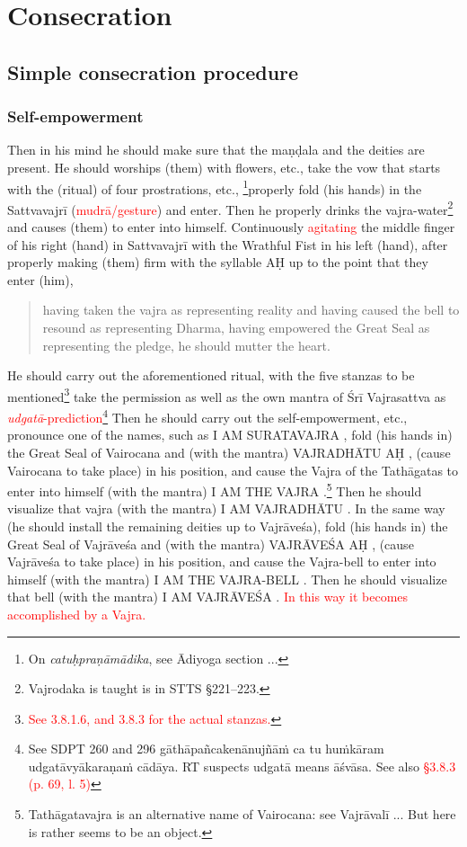 \documentclass[11pt]{book}
\makeatletter
\def\fakesc#1{%
  \begingroup%
  \xdef\fake@name{\csname\curr@fontshape/\f@size\endcsname}%
  \fontsize{1.3\fontdimen8\fake@name}{\baselineskip}\selectfont%
  \uppercase{#1}%
  \endgroup%
}
\newcommand{\mantra}[1]{\fakesc{#1}}
\newcommand{\red}[1]{\textcolor{red}{#1}}
\newcommand{\skt}[1]{\emph{#1}}
\makeatother
\begin{document}
\section{Consecration}
\subsection{Simple consecration procedure}%
\subsubsection{Self-empowerment}
Then in his mind he should make sure that the maṇḍala and the deities are present. He should worships (them) with flowers, etc., take the vow that starts with the (ritual) of four prostrations, etc., \footnote{On \skt{catuḥpraṇāmādika}, see Ādiyoga section ...}properly fold (his hands) in the Sattvavajrī (\red{mudrā/gesture}) and enter. Then he properly drinks the vajra-water\footnote{Vajrodaka is taught is in STTS §221–223.} and causes (them) to enter into himself.  Continuously  \red{agitating} the middle finger of his right (hand) in Sattvavajrī with the Wrathful Fist in his left (hand), after properly making (them) firm with the syllable \mantra{aḥ} up to the point that they enter (him),

\begin{verse}
having taken the vajra as representing reality and having caused the bell to resound as representing Dharma, having empowered the Great Seal as representing the pledge, he should mutter the heart.
\end{verse}

He should carry out the aforementioned ritual, with the five stanzas to be mentioned\footnote{\red{See 3.8.1.6, and 3.8.3 for the actual stanzas.}} take the permission as well as the own mantra of Śrī Vajrasattva as \red{\skt{udgatā}-prediction}\footnote{See SDPT 260 and 296 gāthāpañcakenānujñāṁ ca tu huṁkāram udgatāvyākaraṇaṁ cādāya. RT suspects udgatā means āśvāsa. See also \red{§3.8.3 (p. 69, l. 5)}} Then he should carry out the self-empowerment, etc., pronounce one of the names, such as \mantra{I am Suratavajra}, fold (his hands in) the Great Seal of Vairocana and (with the mantra) \mantra{vajradhātu aḥ}, (cause Vairocana to take place) in his position, and cause the Vajra of the Tathāgatas to enter into himself (with the mantra) \mantra{I am the Vajra}.\footnote{Tathāgatavajra is an alternative name of Vairocana: see Vajrāvalī ... But here is rather seems to be an object.} Then he should visualize that vajra (with the mantra) \mantra{I am Vajradhātu}. In the same way (he should install the remaining deities up to Vajrāveśa), fold (his hands in) the Great Seal of Vajrāveśa and (with the mantra) \mantra{vajrāveśa aḥ}, (cause Vajrāveśa to take place) in his position, and cause the Vajra-bell to enter into himself (with the mantra) \mantra{I am the Vajra-bell}. Then he should visualize that bell (with the mantra) \mantra{I am Vajrāveśa}. \red{In this way it becomes accomplished by a Vajra.}
\end{document}
